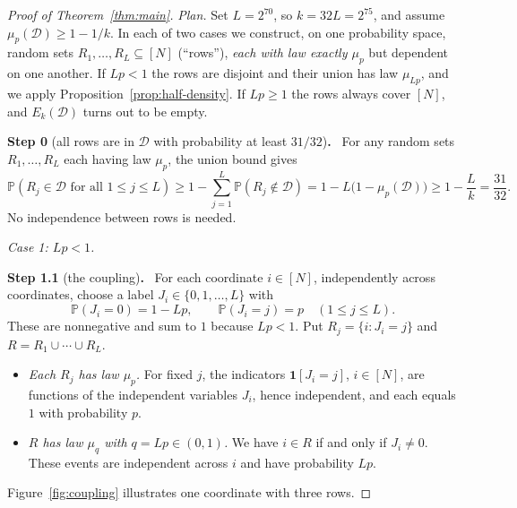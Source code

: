 \documentclass[11pt,letterpaper]{article}
\theoremstyle{definition}
\theoremstyle{remark}
\numberwithin{equation}{section}
\newcommand{\step}[2]{\medskip\noindent\textbf{Step #1} (#2)\textbf{.}\ }
\begin{document}
\begin{proof}[Proof of Theorem~\ref{thm:main}]
\emph{Plan.} Set $L=2^{70}$, so $k=32L=2^{75}$, and assume
$\mu_p(\mathcal D)\ge1-1/k$. In each of two cases we construct, on one
probability space, random sets $R_1,\ldots,R_L\subseteq[N]$ (``rows''),
\emph{each with law exactly $\mu_p$} but dependent on one another. If
$Lp<1$ the rows are disjoint and their union has law $\mu_{Lp}$, and we
apply Proposition~\ref{prop:half-density}. If $Lp\ge1$ the rows always
cover $[N]$, and $E_k(\mathcal D)$ turns out to be empty.

\step{0}{all rows are in $\mathcal D$ with probability at least $31/32$}
For any random sets $R_1,\ldots,R_L$ each having law $\mu_p$, the union
bound gives
\begin{equation}
\label{eq:all-good-rows}
\mathbb P(R_j\in\mathcal D\text{ for all }1\le j\le L)
\ge1-\sum_{j=1}^L\mathbb P(R_j\notin\mathcal D)
=1-L\bigl(1-\mu_p(\mathcal D)\bigr)
\ge1-\frac Lk=\frac{31}{32}.
\end{equation}
No independence between rows is needed.

\medskip
\noindent\emph{Case 1: $Lp<1$.}

\step{1.1}{the coupling}
For each coordinate $i\in[N]$, independently across coordinates, choose a
label $J_i\in\{0,1,\ldots,L\}$ with
\[
\mathbb P(J_i=0)=1-Lp,
\qquad
\mathbb P(J_i=j)=p\quad(1\le j\le L).
\]
These are nonnegative and sum to $1$ because $Lp<1$. Put
$R_j=\{i:J_i=j\}$ and $R=R_1\cup\cdots\cup R_L$.
\begin{itemize}
\item \emph{Each $R_j$ has law $\mu_p$.} For fixed $j$, the indicators
$\mathbf 1[J_i=j]$, $i\in[N]$, are functions of the independent variables
$J_i$, hence independent, and each equals $1$ with probability $p$.
\item \emph{$R$ has law $\mu_q$ with $q=Lp\in(0,1)$.} We have $i\in R$ if
and only if $J_i\ne0$. These events are independent across $i$ and have
probability $Lp$.
\end{itemize}
Figure~\ref{fig:coupling} illustrates one coordinate with three rows.


\end{proof}
\end{document}
